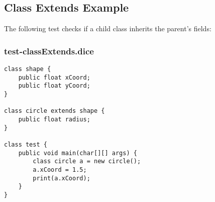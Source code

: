 \subsection{Class Extends Example}
The following test checks if a child class inherits the parent's fields:

\subsubsection{test-classExtends.dice}
\begin{verbatim}
class shape {
	public float xCoord;
	public float yCoord;
}

class circle extends shape {
	public float radius;
}

class test {
	public void main(char[][] args) {
		class circle a = new circle(); 
		a.xCoord = 1.5;
		print(a.xCoord);
	}
}
\end{verbatim}


